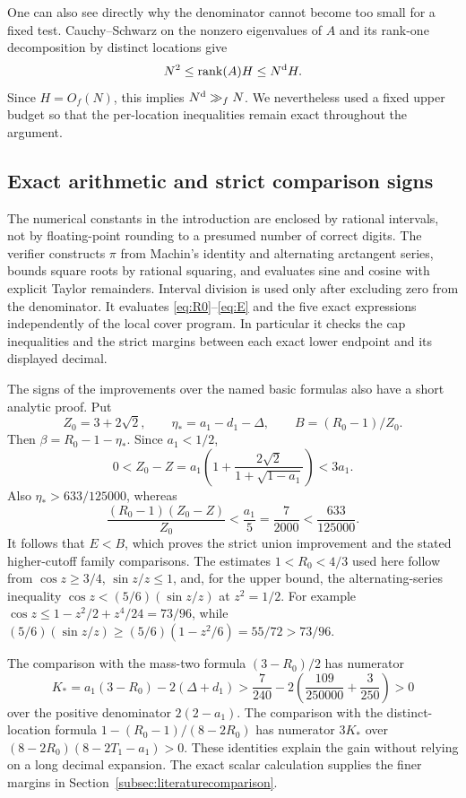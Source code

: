 \documentclass[11pt]{amsart}
\numberwithin{equation}{section}
\newcommand{\rank}{\operatorname{rank}}
\newcommand{\Nd}{N^{\rm d}}
\begin{document}
One can also see directly why the denominator cannot become too small
for a fixed test. Cauchy--Schwarz on the nonzero eigenvalues of $A$
and its rank-one decomposition by distinct locations give
\begin{equation}
 N^2\le\rank(A)H\le\Nd H.\label{eq:ranksafeguard}
\end{equation}
Since $H=O_f(N)$, this implies $\Nd\gg_f N$. We nevertheless
used a fixed upper budget so that the per-location inequalities
remain exact throughout the argument.

\subsection{Exact arithmetic and strict comparison signs}

The numerical constants in the introduction are enclosed by rational
intervals, not by floating-point rounding to a presumed number of
correct digits. The verifier constructs $\pi$ from Machin's identity
and alternating arctangent series, bounds square roots by rational
squaring, and evaluates sine and cosine with explicit Taylor
remainders. Interval division is used only after excluding zero
from the denominator. It evaluates \eqref{eq:R0}--\eqref{eq:E}
and the five exact expressions independently of the local cover
program. In particular it checks the cap inequalities and the
strict margins between each exact lower endpoint and its displayed
decimal. 

The signs of the improvements over the named basic formulas also
have a short analytic proof. Put
\[
 Z_0=3+2\sqrt2,\qquad
 \eta_*=a_1-d_1-\Delta,\qquad B=(R_0-1)/Z_0.
\]
Then $\beta=R_0-1-\eta_*$. Since $a_1<1/2$,
\[
 0<Z_0-Z=a_1\left(1+
          \frac{2\sqrt2}{1+\sqrt{1-a_1}}\right)<3a_1.
\]
Also $\eta_*>633/125000$, whereas
\[
 \frac{(R_0-1)(Z_0-Z)}{Z_0}<\frac{a_1}{5}
     =\frac7{2000}<\frac{633}{125000}.
\]
It follows that $E<B$, which proves the strict union improvement
and the stated higher-cutoff family comparisons. The estimates
$1<R_0<4/3$ used here follow from $\cos z\ge3/4$,
$\sin z/z\le1$, and, for the upper bound, the alternating-series
inequality
$\cos z<(5/6)(\sin z/z)$ at $z^2=1/2$.
For example $\cos z\le1-z^2/2+z^4/24=73/96$, while
$(5/6)(\sin z/z)\ge(5/6)(1-z^2/6)=55/72>73/96$.

The comparison with the mass-two formula $(3-R_0)/2$ has numerator
\[
 K_*=a_1(3-R_0)-2(\Delta+d_1)
 >\frac7{240}-2\left(\frac{109}{250000}+\frac3{250}\right)>0
\]
over the positive denominator $2(2-a_1)$. The comparison with the
distinct-location formula $1-(R_0-1)/(8-2R_0)$ has numerator
$3K_*$ over
$(8-2R_0)(8-2T_1-a_1)>0$. These identities explain the gain
without relying on a long decimal expansion. The exact scalar
calculation supplies the finer margins in
Section~\ref{subsec:literaturecomparison}.
\end{document}
